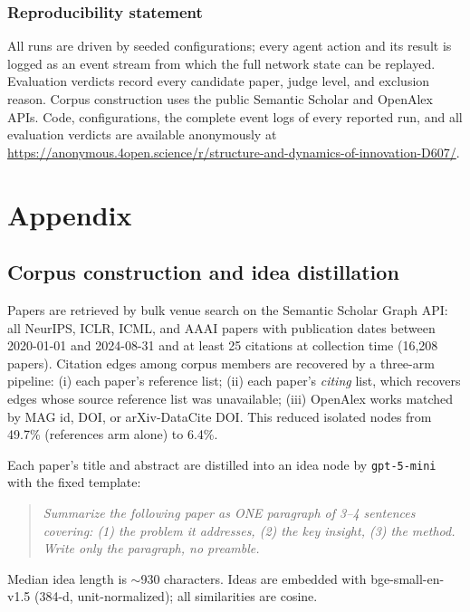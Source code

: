 \documentclass{article} %
\begin{document}
\subsubsection*{Reproducibility statement}
All runs are driven by seeded configurations; every agent action and its
result is logged as an event stream from which the full network state
can be replayed. Evaluation verdicts record every candidate paper,
judge level, and exclusion reason. Corpus construction uses the public
Semantic Scholar and OpenAlex APIs. Code, configurations, the complete
event logs of every reported run, and all evaluation verdicts are
available anonymously at
\url{https://anonymous.4open.science/r/structure-and-dynamics-of-innovation-D607/}.




\appendix
\section{Appendix}

\subsection{Corpus construction and idea distillation}
\label{app:corpus}

Papers are retrieved by bulk venue search on the Semantic Scholar Graph
API: all NeurIPS, ICLR, ICML, and AAAI papers with publication dates
between 2020-01-01 and 2024-08-31 and at least 25 citations at
collection time (16{,}208 papers). Citation edges among corpus members
are recovered by a three-arm pipeline: (i) each paper's reference list;
(ii) each paper's \emph{citing} list, which recovers edges whose source
reference list was unavailable; (iii) OpenAlex works matched by MAG id,
DOI, or arXiv-DataCite DOI. This reduced isolated nodes from 49.7\%
(references arm alone) to 6.4\%.

Each paper's title and abstract are distilled into an idea node by
\texttt{gpt-5-mini} with the fixed template:
\begin{quote}\small\itshape
Summarize the following paper as ONE paragraph of 3--4 sentences
covering: (1) the problem it addresses, (2) the key insight, (3) the
method. Write only the paragraph, no preamble.
\end{quote}
Median idea length is $\sim$930 characters. Ideas are embedded with
bge-small-en-v1.5 \citep{xiao2023bge} (384-d, unit-normalized); all
similarities are cosine.
\end{document}
